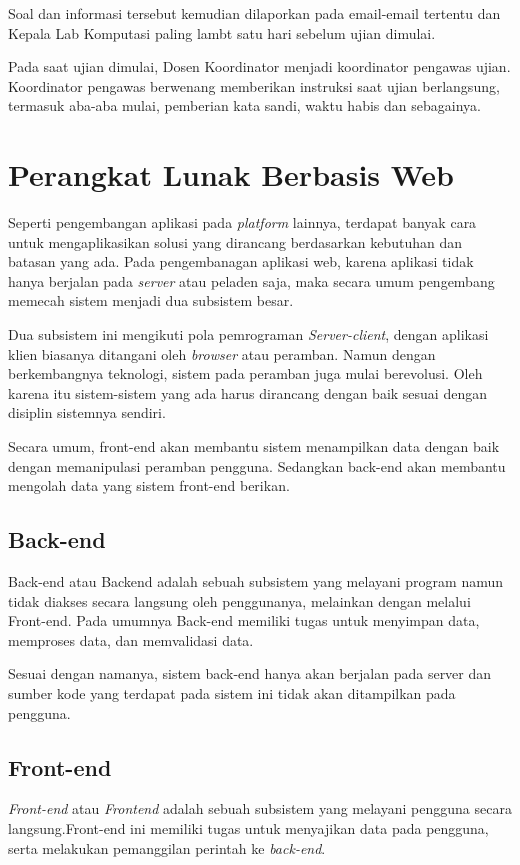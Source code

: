     Soal dan informasi tersebut kemudian dilaporkan pada email-email tertentu
    dan Kepala Lab Komputasi paling lambt satu hari sebelum ujian dimulai.

    Pada saat ujian dimulai, Dosen Koordinator menjadi koordinator pengawas
    ujian. Koordinator pengawas berwenang memberikan instruksi saat ujian
    berlangsung, termasuk aba-aba mulai, pemberian kata sandi, waktu habis dan
    sebagainya.

\section{Perangkat Lunak Berbasis Web}
    Seperti pengembangan aplikasi pada \textit{platform} lainnya, terdapat
    banyak cara untuk mengaplikasikan solusi yang dirancang berdasarkan
    kebutuhan dan batasan yang ada. Pada pengembanagan aplikasi web, karena
    aplikasi tidak hanya berjalan pada \textit{server} atau peladen saja, maka
    secara umum pengembang memecah sistem menjadi dua subsistem besar.
    
    Dua subsistem ini mengikuti pola pemrograman \textit{Server-client}, dengan
    aplikasi klien biasanya ditangani oleh \textit{browser} atau peramban. Namun
    dengan berkembangnya teknologi, sistem pada peramban juga mulai berevolusi.
    Oleh karena itu sistem-sistem yang ada harus dirancang dengan baik sesuai
    dengan disiplin sistemnya sendiri.
    
    Secara umum, front-end akan membantu sistem menampilkan data dengan baik
    dengan memanipulasi peramban pengguna. Sedangkan back-end akan membantu
    mengolah data yang sistem front-end berikan.

\subsection{Back-end}
    Back-end atau Backend adalah sebuah subsistem yang melayani program namun
    tidak diakses secara langsung oleh penggunanya, melainkan dengan melalui
    Front-end\cite{oxford:definition-backend}. Pada umumnya Back-end memiliki
    tugas untuk menyimpan data, memproses data, dan memvalidasi data.
    
    Sesuai dengan namanya, sistem back-end hanya akan berjalan pada server dan
    sumber kode yang terdapat pada sistem ini tidak akan ditampilkan pada
    pengguna.

\subsection{Front-end}
    \textit{Front-end} atau \textit{Frontend} adalah sebuah subsistem yang
    melayani pengguna secara langsung\cite{oxford:definition-frontend}.Front-end
    ini memiliki tugas untuk menyajikan data pada pengguna, serta melakukan
    pemanggilan perintah ke \textit{back-end}.
    
